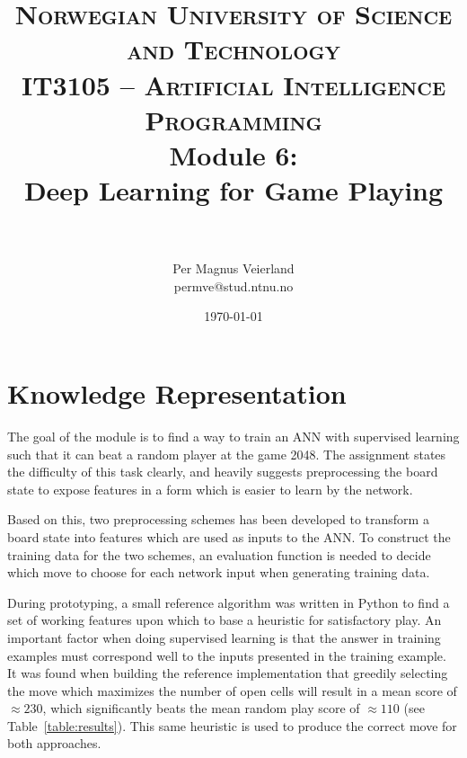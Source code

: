

\usepackage{float}
\usepackage{tabularx}

\title{
\normalfont \normalsize
\textsc{Norwegian University of Science and Technology\\IT3105 -- Artificial Intelligence Programming}
\horrule{0.5pt} \\[0.4cm]
\huge Module 6:\\ Deep Learning for Game Playing\\
\horrule{2pt} \\[0.5cm]
}

\author{Per Magnus Veierland\\permve@stud.ntnu.no}

\date{\normalsize\today}




\fancyfoot[C]{}
\maketitle

\newpage
{} %
\setcounter{page}{1}

\section*{Knowledge Representation}

The goal of the module is to find a way to train an \ac{ANN} with supervised learning such that it can beat a random player at the game \textsc{2048}. The assignment states the difficulty of this task clearly, and heavily suggests preprocessing the board state to expose features in a form which is easier to learn by the network.

Based on this, two preprocessing schemes has been developed to transform a board state into features which are used as inputs to the \ac{ANN}. To construct the training data for the two schemes, an evaluation function is needed to decide which move to choose for each network input when generating training data.

During prototyping, a small reference algorithm was written in Python to find a set of working features upon which to base a heuristic for satisfactory play. An important factor when doing supervised learning is that the answer in training examples must correspond well to the inputs presented in the training example. It was found when building the reference implementation that greedily selecting the move which maximizes the number of open cells will result in a mean score of $\approx 230$, which significantly beats the mean random play score of $\approx 110$ (see Table~\ref{table:results}). This same heuristic is used to produce the correct move for both approaches.

